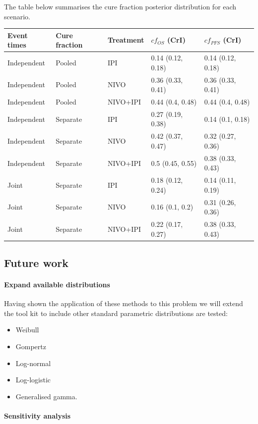 \documentclass[
]{article}
\providecommand{\tightlist}{%
  \setlength{\itemsep}{0pt}\setlength{\parskip}{0pt}}
\begin{document}
The table below summarises the cure fraction posterior distribution for
each scenario.

\begin{longtable}[]{@{}lllll@{}}
\toprule
Event times & Cure fraction & Treatment & \(cf_{OS}\) (CrI) &
\(cf_{PFS}\) (CrI)\tabularnewline
\midrule
\endhead
Independent & Pooled & IPI & 0.14 (0.12, 0.18) & 0.14 (0.12,
0.18)\tabularnewline
Independent & Pooled & NIVO & 0.36 (0.33, 0.41) & 0.36 (0.33,
0.41)\tabularnewline
Independent & Pooled & NIVO+IPI & 0.44 (0.4, 0.48) & 0.44 (0.4,
0.48)\tabularnewline
Independent & Separate & IPI & 0.27 (0.19, 0.38) & 0.14 (0.1,
0.18)\tabularnewline
Independent & Separate & NIVO & 0.42 (0.37, 0.47) & 0.32 (0.27,
0.36)\tabularnewline
Independent & Separate & NIVO+IPI & 0.5 (0.45, 0.55) & 0.38 (0.33,
0.43)\tabularnewline
Joint & Separate & IPI & 0.18 (0.12, 0.24) & 0.14 (0.11,
0.19)\tabularnewline
Joint & Separate & NIVO & 0.16 (0.1, 0.2) & 0.31 (0.26,
0.36)\tabularnewline
Joint & Separate & NIVO+IPI & 0.22 (0.17, 0.27) & 0.38 (0.33,
0.43)\tabularnewline
\bottomrule
\end{longtable}

\hypertarget{future-work}{%
\subsection{Future work}\label{future-work}}

\hypertarget{expand-available-distributions}{%
\paragraph{Expand available
distributions}\label{expand-available-distributions}}

Having shown the application of these methods to this problem we will
extend the tool kit to include other standard parametric distributions
are tested:

\begin{itemize}
\tightlist
\item
  Weibull
\item
  Gompertz
\item
  Log-normal
\item
  Log-logistic
\item
  Generalised gamma.
\end{itemize}

\hypertarget{sensitivity-analysis}{%
\paragraph{Sensitivity analysis}\label{sensitivity-analysis}}
\end{document}
